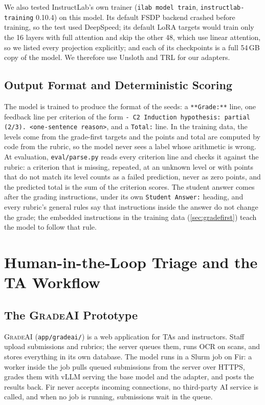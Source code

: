 \documentclass[11pt,a4paper]{article}
\newif\ifdraft
\newcommand{\todo}[2]{%
  \ifdraft\textcolor{red}{\textbf{[TODO #1:} #2\textbf{]}}\fi}
\newcommand{\gradeai}{\textsc{GradeAI}}
\newcommand{\file}[1]{\nolinkurl{#1}}
\theoremstyle{definition}
\begin{document}
We also tested InstructLab's own trainer (\texttt{ilab model train}, \texttt{instructlab-training} 0.10.4) on this model. Its default FSDP backend crashed before training, so the test used DeepSpeed; its default LoRA targets would train only the 16 layers with full attention and skip the other 48, which use linear attention, so we listed every projection explicitly; and each of its checkpoints is a full 54\,GB copy of the model. We therefore use Unsloth and TRL for our adapters.
\todo{}{Confirm which trainer and which data files produced the adapter evaluated in \cref{sec:results}, and name the adapter folder.}

\subsection{Output Format and Deterministic Scoring}\label{sec:schema}
The model is trained to produce the format of the seeds: a \texttt{**Grade:**} line, one feedback line per criterion of the form \texttt{- C2 Induction hypothesis: partial (2/3). <one-sentence reason>}, and a \texttt{Total:} line. In the training data, the levels come from the grade-first targets and the points and total are computed by code from the rubric, so the model never sees a label whose arithmetic is wrong. At evaluation, \file{eval/parse.py} reads every criterion line and checks it against the rubric: a criterion that is missing, repeated, at an unknown level or with points that do not match its level counts as a failed prediction, never as zero points, and the predicted total is the sum of the criterion scores. The student answer comes after the grading instructions, under its own \texttt{Student Answer:} heading, and every rubric's general rules say that instructions inside the answer do not change the grade; the embedded instructions in the training data (\cref{sec:gradefirst}) teach the model to follow that rule.

\section{Human-in-the-Loop Triage and the TA Workflow}\label{sec:uq}

\subsection{The \gradeai{} Prototype}
\gradeai{} (\file{app/gradeai/}) is a web application for TAs and instructors. Staff upload submissions and rubrics; the server queues them, runs OCR on scans, and stores everything in its own database. The model runs in a Slurm job on Fir: a worker inside the job pulls queued submissions from the server over HTTPS, grades them with vLLM serving the base model and the adapter, and posts the results back. Fir never accepts incoming connections, no third-party AI service is called, and when no job is running, submissions wait in the queue.
\end{document}
